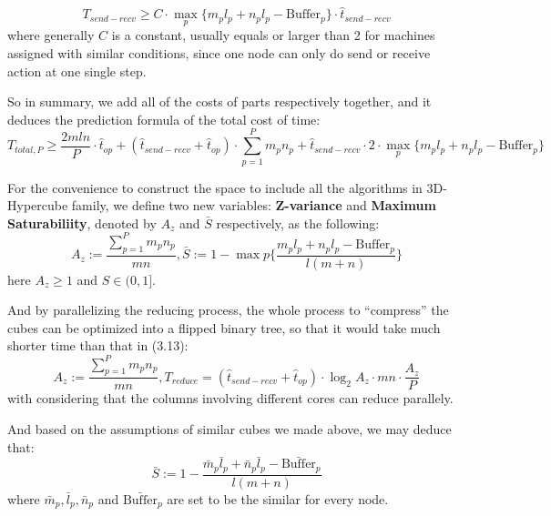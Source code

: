 \documentclass{amsart}
\theoremstyle{definition}
\theoremstyle{remark}
\numberwithin{equation}{section}
\begin{document}
\begin{equation}
T_{send-recv}\ge C\cdot\max \limits_{p}\{m_pl_p+n_pl_p-\text{Buffer}_p\}\cdot\hat{t}_{send-recv}
\end{equation}
where generally $C$ is a constant, usually equals or larger than 2 for machines assigned with similar conditions, since one node can only do send or receive action at one single step.\par
	So in summary, we add all of the costs of parts respectively together, and it deduces the prediction formula of the total cost of time:
\begin{equation}
T_{total,P}\ge \frac{2mln}{P}\cdot\hat{t}_{op}+(\hat{t}_{send-recv}+\hat{t}_{op})\cdot
			\sum_{p=1}^{P}m_pn_p+\hat{t}_{send-recv}\cdot 2
			\cdot \max \limits_{p}\{m_pl_p+n_pl_p-\text{Buffer}_p\}
\end{equation}
\par
For the convenience to construct the space to include all the algorithms in 3D-Hypercube family, we define two new variables: \textbf{Z-variance} and \textbf{Maximum Saturabiliity}, denoted by $A_z$ and $\bar{S}$ respectively, as the following:
\begin{equation}
A_z:=\frac{\sum_{p=1}^{P}m_pn_p}{mn},
\bar{S}:=1-\max \limits{p}\{\frac{m_pl_p+n_pl_p-\text{Buffer}_p}{l(m+n)}\}
\end{equation}
here $A_z\ge 1$ and $S\in(0,1]$.\par

And by parallelizing the reducing process, the whole process to “compress” the cubes can be optimized into a flipped binary tree, so that it would take much shorter time than that in (3.13):
\begin{equation}
A_z:=\frac{\sum_{p=1}^{P}m_pn_p}{mn},
T_{reduce}=(\hat{t}_{send-recv}+\hat{t}_{op})\cdot \log_{2}A_z\cdot mn\cdot\frac{A_z}{P}
\end{equation}
with considering that the columns involving different cores can reduce parallely.\par

	And based on the assumptions of similar cubes we made above, we may deduce that:
\begin{equation}
\bar{S}:=1-\frac{\bar{m}_p\bar{l}_p+\bar{n}_p\bar{l}_p-\bar{\text{Buffer}}_p}{l(m+n)}
\end{equation}
where $\bar{m}_p,\bar{l}_p, \bar{n}_p$ and $\bar{\text{Buffer}}_p$ are set to be the similar for every node.\par
\end{document}
